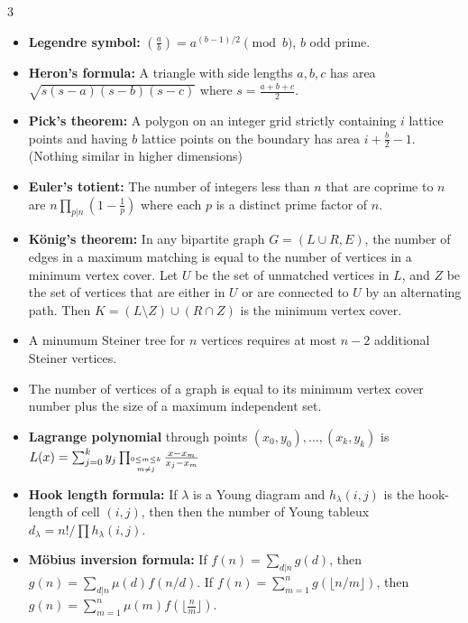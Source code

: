 \documentclass[a4paper, 8pt, landscape, oneside]{extarticle}
\begin{document}
\begin{multicols*}{3}
      
        \begin{itemize}[leftmargin=*]
          \item \textbf{Legendre symbol:} $\left(\frac{a}{b}\right) = a^{(b-1)/2} \pmod{b}$, $b$ odd prime.
          \item \textbf{Heron's formula:} A triangle with side lengths
            $a,b,c$ has area $\sqrt{s(s-a)(s-b)(s-c)}$ where $s =
            \frac{a+b+c}{2}$.
          \item \textbf{Pick's theorem:} A polygon on an integer grid
            strictly containing $i$ lattice points and having $b$ lattice
            points on the boundary has area $i + \frac{b}{2} - 1$. (Nothing
            similar in higher dimensions)
          \item \textbf{Euler's totient:} The number of integers less than
            $n$ that are coprime to $n$ are $n\prod_{p|n}\left(1 - \frac{1}{p}\right)$
            where each $p$ is a distinct prime factor of $n$.
          \item \textbf{König's theorem:} In any bipartite graph $G=(L\cup R,E)$, the number
            of edges in a maximum matching is equal to the number of
            vertices in a minimum vertex cover. Let $U$ be the set of
            unmatched vertices in $L$, and $Z$ be the set of vertices that
            are either in $U$ or are connected to $U$ by an alternating
            path. Then $K=(L\setminus Z)\cup(R\cap Z)$ is the minimum
            vertex cover.
          \item A minumum Steiner tree for $n$ vertices requires at most $n-2$ additional Steiner vertices.
          \item The number of vertices of a graph is equal to its minimum
            vertex cover number plus the size of a maximum independent set.
          \item \textbf{Lagrange polynomial} through points $(x_0,y_0),\ldots,(x_k,y_k)$ is $L(x) = \sum_{j=0}^k y_j \prod_{\shortstack{$\scriptscriptstyle 0\leq m \leq k$ \\ $\scriptscriptstyle m\neq j$}} \frac{x-x_m}{x_j - x_m}$
          \item \textbf{Hook length formula:} If $\lambda$ is a Young diagram and $h_{\lambda}(i,j)$ is the hook-length of cell $(i,j)$, then then the number of Young tableux $d_{\lambda} = n!/\prod h_{\lambda}(i,j)$.
          \item \textbf{Möbius inversion formula:} If $f(n) = \sum_{d|n} g(d)$, then $g(n) = \sum_{d|n} \mu(d) f(n/d)$. If $f(n) = \sum_{m=1}^n g(\lfloor n/m\rfloor)$, then $g(n) = \sum_{m=1}^n \mu(m)f(\lfloor\frac{n}{m}\rfloor)$.

\end{itemize}
\end{multicols*}
\end{document}
